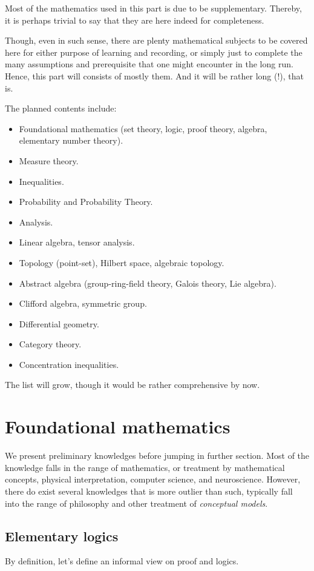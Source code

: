 Most of the mathematics used in this part is due to be supplementary. Thereby, it is perhaps trivial to say that they are here indeed for completeness. 


Though, even in such sense, there are plenty mathematical subjects to be covered here for either purpose of learning and recording, or simply just to complete the many assumptions and prerequisite that one might encounter in the long run. Hence, this part will consists of mostly them. And it will be rather long (!), that is. 

The planned contents include: 
\begin{itemize}[topsep=1.23pt,itemsep=1pt]
    \item Foundational mathematics (set theory, logic, proof theory, algebra, elementary number theory).
    \item Measure theory. 
    \item Inequalities. 
    \item Probability and Probability Theory. 
    \item Analysis.
    \item Linear algebra, tensor analysis. 
    \item Topology (point-set), Hilbert space, algebraic topology.
    \item Abstract algebra (group-ring-field theory, Galois theory, Lie algebra).
    \item Clifford algebra, symmetric group. 
    \item Differential geometry. 
    \item Category theory. 
    \item Concentration inequalities. 
\end{itemize}
The list will grow, though it would be rather comprehensive by now. 
\chapter{Foundational mathematics}
We present preliminary knowledges before jumping in further section. Most of the knowledge falls in the range of mathematics, or treatment by mathematical concepts, physical interpretation, computer science, and neuroscience. However, there do exist several knowledges that is more outlier than such, typically fall into the range of philosophy and other treatment of \textit{conceptual models}. 
\section{Elementary logics}
By definition, let's define an informal view on  proof and  logics. 


